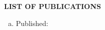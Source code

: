 \documentclass[12pt]{article}
\begin{document}
\begin{minipage}{1.05\textwidth}

\end{minipage}

\pagebreak
\vspace{0.4cm}
\colorbox{gray!40}{\begin{minipage}{17.5cm}
\bf {LIST OF PUBLICATIONS} 
\end{minipage} }
\begin{minipage}{1.05\textwidth}
  
  \vspace{0.4cm}
  \begin{enumerate}[a.]
  \item Published:
    

\end{enumerate}
\end{minipage}
\end{document}
